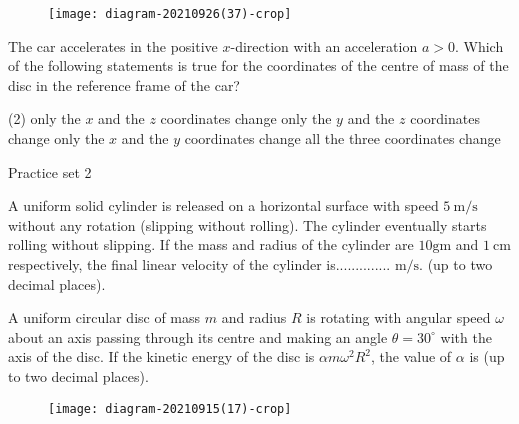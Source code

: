 \begin{enumerate}
\begin{minipage}{\textwidth}
	\begin{figure}[H]
		\centering
		\texttt{[image: diagram-20210926(37)-crop]}
	\end{figure}
	The car accelerates in the positive $x$-direction with an acceleration $a>0 .$ Which of the following statements is true for the coordinates of the centre of mass of the disc in the reference frame of the car?
\end{minipage}
\begin{tasks}(2)
	\task[\textbf{A.}] only the $x$ and the $z$ coordinates change
	\task[\textbf{B.}]only the $y$ and the $z$ coordinates change
	\task[\textbf{C.}]only the $x$ and the $y$ coordinates change
	\task[\textbf{D.}]all the three coordinates change
\end{tasks}
\end{enumerate}


\newpage
\begin{abox}
	Practice set 2
	\end{abox}
\begin{enumerate}
\begin{minipage}{\textwidth}
	\item A uniform solid cylinder is released on a horizontal surface with speed $5 \mathrm{~m} / \mathrm{s}$ without any rotation (slipping without rolling). The cylinder eventually starts rolling without slipping. If the mass and radius of the cylinder are $10 \mathrm{gm}$ and $1 \mathrm{~cm}$ respectively, the final linear velocity of the cylinder is.............. $\mathrm{m} / \mathrm{s}$. (up to two decimal places).
\end{minipage}
\begin{minipage}{\textwidth}
	\item A uniform circular disc of mass $m$ and radius $R$ is rotating with angular speed $\omega$ about an axis passing through its centre and making an angle $\theta=30^{\circ}$ with the axis of the disc. If the kinetic energy of the disc is $\alpha m \omega^{2} R^{2}$, the value of $\alpha$ is (up to two decimal places).
	\begin{figure}[H]
		\centering
		\texttt{[image: diagram-20210915(17)-crop]}
	\end{figure}
\end{minipage}
\end{enumerate}


